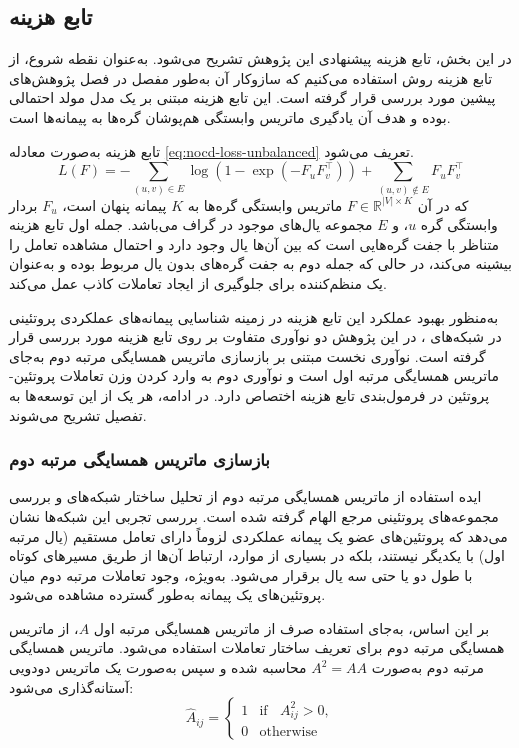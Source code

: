 \subsection{تابع هزینه}

در این بخش، تابع هزینه پیشنهادی این پژوهش تشریح می‌شود. به‌عنوان نقطه شروع، از تابع هزینه روش  استفاده می‌کنیم که سازوکار آن به‌طور مفصل در فصل پژوهش‌های پیشین مورد بررسی قرار گرفته است. این تابع هزینه مبتنی بر یک مدل مولد احتمالی بوده و هدف آن یادگیری ماتریس وابستگی هم‌پوشان گره‌ها به پیمانه‌ها است.

تابع هزینه  به‌صورت معادله \ref{eq:nocd-loss-unbalanced} تعریف می‌شود.
\begin{equation}
	L(F) = -\sum_{(u,v)\in E}
	\log\left(1-\exp(-F_u F_v^{\top})\right)
	+ \sum_{(u,v)\notin E}
	F_u F_v^{\top}
	\label{eq:nocd-loss-unbalanced}
\end{equation}
که در آن $F \in \mathbb{R}^{|V|\times K}$ ماتریس وابستگی گره‌ها به $K$ پیمانه پنهان است، $F_u$ بردار وابستگی گره $u$، و $E$ مجموعه یال‌های موجود در گراف می‌باشد. جمله اول تابع هزینه متناظر با جفت ‌گره‌هایی است که بین آن‌ها یال وجود دارد و احتمال مشاهده تعامل را بیشینه می‌کند، در حالی که جمله دوم به جفت‌ گره‌های بدون یال مربوط بوده و به‌عنوان یک منظم‌کننده برای جلوگیری از ایجاد تعاملات کاذب عمل می‌کند.

به‌منظور بهبود عملکرد این تابع هزینه در زمینه شناسایی پیمانه‌های عملکردی پروتئینی در شبکه‌های ، در این پژوهش دو نوآوری متفاوت بر روی تابع هزینه  مورد بررسی قرار گرفته است. نوآوری نخست مبتنی بر بازسازی ماتریس همسایگی مرتبه دوم به‌جای ماتریس همسایگی مرتبه اول است و نوآوری دوم به وارد کردن وزن تعاملات پروتئین-پروتئین در فرمول‌بندی تابع هزینه اختصاص دارد. در ادامه، هر یک از این توسعه‌ها به ‌تفصیل تشریح می‌شوند.

\subsubsection{بازسازی ماتریس همسایگی مرتبه دوم}

ایده استفاده از ماتریس همسایگی مرتبه دوم از تحلیل ساختار شبکه‌های  و بررسی مجموعه‌های پروتئینی مرجع الهام گرفته شده است. بررسی تجربی این شبکه‌ها نشان می‌دهد که پروتئین‌های عضو یک پیمانه عملکردی لزوماً دارای تعامل مستقیم (یال مرتبه اول) با یکدیگر نیستند، بلکه در بسیاری از موارد، ارتباط آن‌ها از طریق مسیرهای کوتاه با طول دو یا حتی سه یال برقرار می‌شود. به‌ویژه، وجود تعاملات مرتبه دوم میان پروتئین‌های یک پیمانه به‌طور گسترده مشاهده می‌شود.

بر این اساس، به‌جای استفاده صرف از ماتریس همسایگی مرتبه اول $A$، از ماتریس همسایگی مرتبه دوم برای تعریف ساختار تعاملات استفاده می‌شود. ماتریس همسایگی مرتبه دوم به‌صورت $A^2 = AA$ محاسبه شده و سپس به‌صورت یک ماتریس دودویی آستانه‌گذاری می‌شود:
\begin{equation}
	\hat{A}_{ij} =
	\begin{cases}
		1 & \text{if } \; \; A^2_{ij} > 0, \\
		0 & \text{otherwise}
	\end{cases}
	\label{eq:nocd-A2}
\end{equation}

